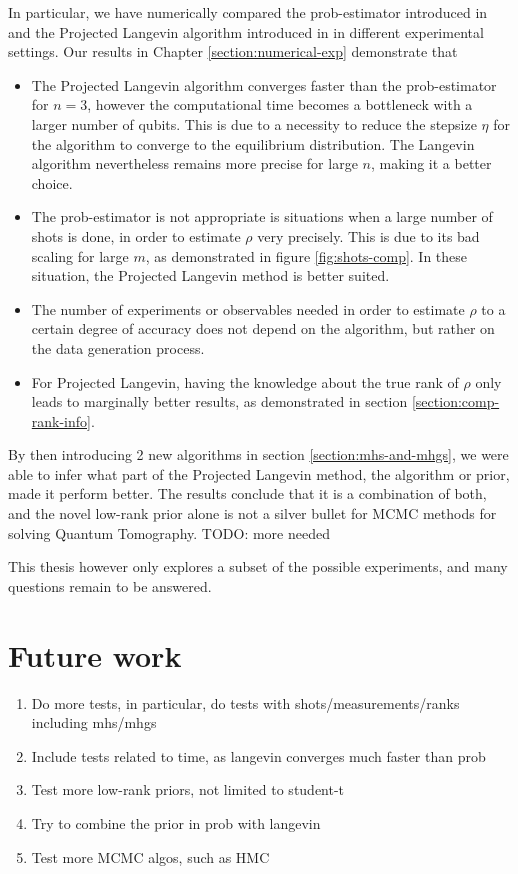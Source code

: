 \documentclass[12pt]{memoir}
\begin{document}
In particular, we have numerically compared the prob-estimator introduced in \cite{MA17} and the Projected Langevin algorithm introduced in \cite{meth:bayesian:Langevin:ACMT2024} in different experimental settings. Our results in Chapter \ref{section:numerical-exp} demonstrate that 
\begin{itemize}
    \item The Projected Langevin algorithm converges faster than the prob-estimator for $n=3$, however the computational time becomes a bottleneck with a larger number of qubits. This is due to a necessity to reduce the stepsize $\eta$ for the algorithm to converge to the equilibrium distribution. The Langevin algorithm nevertheless remains more precise for large $n$, making it a better choice.
    \item The prob-estimator is not appropriate is situations when a large number of shots is done, in order to estimate $\rho$ very precisely. This is due to its bad scaling for large $m$, as demonstrated in figure \ref{fig:shots-comp}. In these situation, the Projected Langevin method is better suited.
    \item The number of experiments or observables needed in order to estimate $\rho$ to a certain degree of accuracy does not depend on the algorithm, but rather on the data generation process.
    \item For Projected Langevin, having the knowledge about the true rank of $\rho$ only leads to marginally better results, as demonstrated in section \ref{section:comp-rank-info}.
\end{itemize}
By then introducing 2 new algorithms in section \ref{section:mhs-and-mhgs}, we were able to infer what part of the Projected Langevin method, the algorithm or prior, made it perform better. The results conclude that it is a combination of both, and the novel low-rank prior alone is not a silver bullet for MCMC methods for solving Quantum Tomography. TODO: more needed\medbreak 

This thesis however only explores a subset of the possible experiments, and many questions remain to be answered.
\chapter{Future work}
\begin{enumerate}
    \item Do more tests, in particular, do tests with shots/measurements/ranks including mhs/mhgs
    \item Include tests related to time, as langevin converges much faster than prob
    \item Test more low-rank priors, not limited to student-t
    \item Try to combine the prior in prob with langevin
    \item Test more MCMC algos, such as HMC
\end{enumerate}
\end{document}
